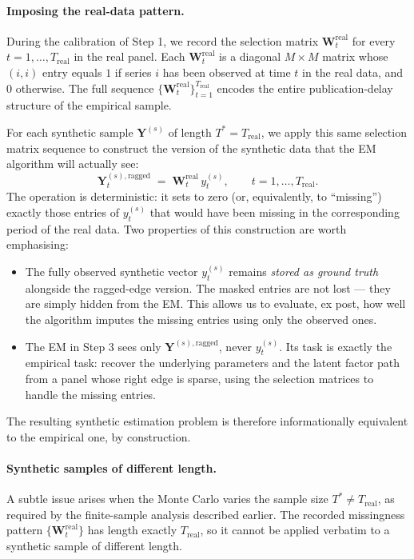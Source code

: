\documentclass[11pt, a4paper, oneside]{article}
\newcommand{\mY}{\mathbf{Y}}
\begin{document}
\paragraph{Imposing the real-data pattern.}
During the calibration of Step 1, we record the selection matrix
$\mathbf{W}_t^{\mathrm{real}}$ for every $t = 1, \ldots, T_{\mathrm{real}}$
in the real panel. Each $\mathbf{W}_t^{\mathrm{real}}$ is a
diagonal $M \times M$ matrix whose $(i, i)$ entry equals $1$ if
series $i$ has been observed at time $t$ in the real data, and
$0$ otherwise. The full sequence
$\{\mathbf{W}_t^{\mathrm{real}}\}_{t = 1}^{T_{\mathrm{real}}}$
encodes the entire publication-delay structure of the empirical
sample.

For each synthetic sample $\mY^{(s)}$ of length
$T^* = T_{\mathrm{real}}$, we apply this same selection matrix
sequence to construct the version of the synthetic data that the
EM algorithm will actually see:
\[
\mY^{(s), \mathrm{ragged}}_t \;=\; \mathbf{W}_t^{\mathrm{real}}\, y_t^{(s)},
\qquad t = 1, \ldots, T_{\mathrm{real}}.
\]
The operation is deterministic: it sets to zero (or, equivalently,
to ``missing'') exactly those entries of $y_t^{(s)}$ that would
have been missing in the corresponding period of the real data.
Two properties of this construction are worth emphasising:
\begin{itemize}[leftmargin=1.5em, itemsep=3pt]
    \item The fully observed synthetic vector $y_t^{(s)}$ remains
          \emph{stored as ground truth} alongside the ragged-edge
          version. The masked entries are not lost — they are
          simply hidden from the EM. This allows us to evaluate,
          ex post, how well the algorithm imputes the missing
          entries using only the observed ones.
    \item The EM in Step 3 sees only $\mY^{(s), \mathrm{ragged}}$,
          never $y_t^{(s)}$. Its task is exactly the empirical
          task: recover the underlying parameters and the latent
          factor path from a panel whose right edge is sparse,
          using the selection matrices to handle the missing
          entries.
\end{itemize}
The resulting synthetic estimation problem is therefore
informationally equivalent to the empirical one, by construction.

\paragraph{Synthetic samples of different length.}
A subtle issue arises when the Monte Carlo varies the sample size
$T^* \neq T_{\mathrm{real}}$, as required by the finite-sample
analysis described earlier. The recorded missingness pattern
$\{\mathbf{W}_t^{\mathrm{real}}\}$ has length exactly
$T_{\mathrm{real}}$, so it cannot be applied verbatim to a
synthetic sample of different length.
\end{document}
